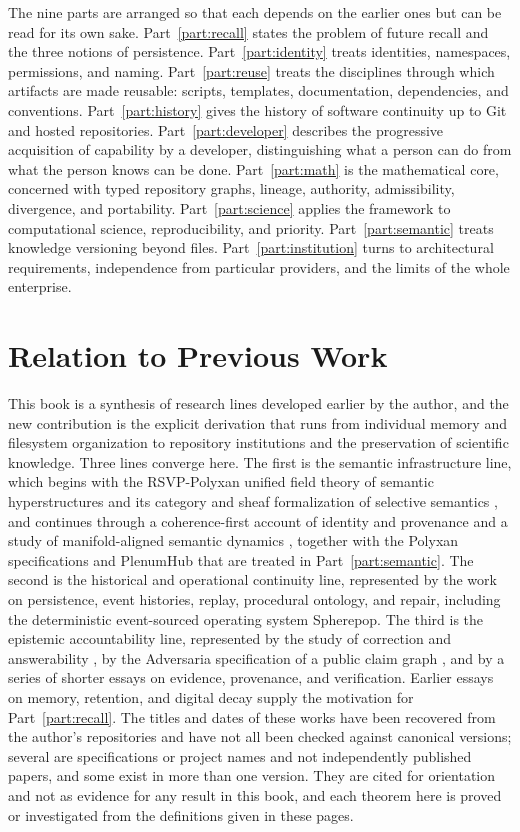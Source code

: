 \documentclass[11pt,twoside,openright]{book}
\theoremstyle{plain}
\theoremstyle{definition}
\theoremstyle{remark}
\begin{document}
The nine parts are arranged so that each depends on the earlier ones but can be read for its own sake. Part~\ref{part:recall} states the problem of future recall and the three notions of persistence. Part~\ref{part:identity} treats identities, namespaces, permissions, and naming. Part~\ref{part:reuse} treats the disciplines through which artifacts are made reusable: scripts, templates, documentation, dependencies, and conventions. Part~\ref{part:history} gives the history of software continuity up to Git and hosted repositories. Part~\ref{part:developer} describes the progressive acquisition of capability by a developer, distinguishing what a person can do from what the person knows can be done. Part~\ref{part:math} is the mathematical core, concerned with typed repository graphs, lineage, authority, admissibility, divergence, and portability. Part~\ref{part:science} applies the framework to computational science, reproducibility, and priority. Part~\ref{part:semantic} treats knowledge versioning beyond files. Part~\ref{part:institution} turns to architectural requirements, independence from particular providers, and the limits of the whole enterprise.

\section*{Relation to Previous Work}

This book is a synthesis of research lines developed earlier by the author, and the new contribution is the explicit derivation that runs from individual memory and filesystem organization to repository institutions and the preservation of scientific knowledge. Three lines converge here. The first is the semantic infrastructure line, which begins with the RSVP-Polyxan unified field theory of semantic hyperstructures \cite{flyxion2025rsvp} and its category and sheaf formalization of selective semantics \cite{flyxion2025membrane}, and continues through a coherence-first account of identity and provenance \cite{flyxion2026coherence} and a study of manifold-aligned semantic dynamics \cite{flyxion2026manifold}, together with the Polyxan specifications and PlenumHub that are treated in Part~\ref{part:semantic}. The second is the historical and operational continuity line, represented by the work on persistence, event histories, replay, procedural ontology, and repair, including the deterministic event-sourced operating system Spherepop. The third is the epistemic accountability line, represented by the study of correction and answerability \cite{flyxion2026geometry}, by the Adversaria specification of a public claim graph \cite{flyxion2026adversaria}, and by a series of shorter essays on evidence, provenance, and verification. Earlier essays on memory, retention, and digital decay supply the motivation for Part~\ref{part:recall}. The titles and dates of these works have been recovered from the author's repositories and have not all been checked against canonical versions; several are specifications or project names and not independently published papers, and some exist in more than one version. They are cited for orientation and not as evidence for any result in this book, and each theorem here is proved or investigated from the definitions given in these pages.
\end{document}
